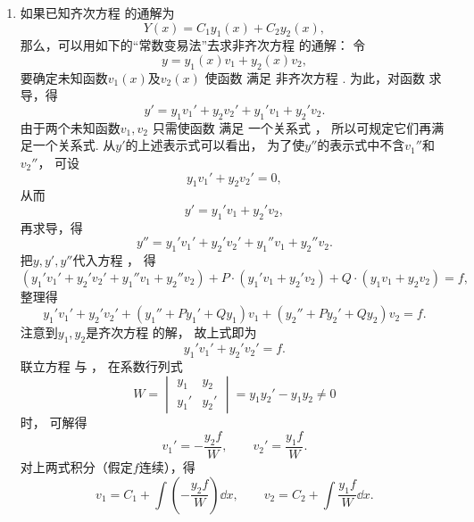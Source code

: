 \begin{enumerate}
	\item%
	如果已知齐次方程  的通解为\[
		Y(x) = C_1 y_1(x) + C_2 y_2(x),
	\]
	那么，可以用如下的“常数变易法”去求非齐次方程  的通解：
	令\begin{equation}\label{equation:微分方程.二阶非齐次线性微分方程的通解设想}
		y = y_1(x) v_1 + y_2(x) v_2,
	\end{equation}
	要确定未知函数\(v_1(x)\)及\(v_2(x)\)
	使函数  满足
	非齐次方程 .
	为此，对函数  求导，得\[
		y' = y_1 v_1' + y_2 v_2' + y_1' v_1 + y_2' v_2.
	\]
	由于两个未知函数\(v_1,v_2\)
	只需使函数  满足
	一个关系式 ，
	所以可规定它们再满足一个关系式.
	从\(y'\)的上述表示式可以看出，
	为了使\(y''\)的表示式中不含\(v_1''\)和\(v_2''\)，
	可设\begin{equation}\label{equation:微分方程.二阶非齐次线性微分方程的额外条件1}
		y_1 v_1' + y_2 v_2' = 0,
	\end{equation}
	从而\[
		y' = y_1' v_1 + y_2' v_2,
	\]
	再求导，得\[
		y'' = y_1' v_1' + y_2' v_2' + y_1'' v_1 + y_2'' v_2.
	\]
	把\(y,y',y''\)代入方程 ，
	得\[
		(y_1' v_1' + y_2' v_2' + y_1'' v_1 + y_2'' v_2)
		+P\cdot(y_1' v_1 + y_2' v_2) + Q\cdot(y_1 v_1 + y_2 v_2) = f,
	\]
	整理得\[
		y_1' v_1' + y_2' v_2'
		+ (y_1'' + P y_1' + Q y_1) v_1
		+ (y_2'' + P y_2' + Q y_2) v_2
		= f.
	\]
	注意到\(y_1,y_2\)是齐次方程  的解，
	故上式即为
	\begin{equation}\label{equation:微分方程.二阶非齐次线性微分方程的额外条件2}
		y_1' v_1' + y_2' v_2' = f.
	\end{equation}
	联立方程 
	与 ，
	在系数行列式\[
		W = \begin{vmatrix} y_1 & y_2 \\ y_1' & y_2' \end{vmatrix}
		= y_1 y_2' - y_1 y_2 \neq0
	\]时，
	可解得\[
		v_1' = -\frac{y_2 f}{W},
		\qquad
		v_2' = \frac{y_1 f}{W}.
	\]
	对上两式积分（假定\(f\)连续），得\[
		v_1 = C_1 + \int \left(-\frac{y_2 f}{W}\right) \dd{x},
		\qquad
		v_2 = C_2 + \int \frac{y_1 f}{W} \dd{x}.
	\]


\end{enumerate}
